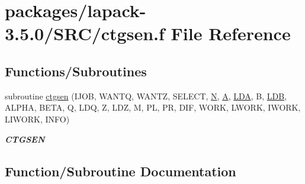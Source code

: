 \hypertarget{ctgsen_8f}{}\section{packages/lapack-\/3.5.0/\+S\+R\+C/ctgsen.f File Reference}
\label{ctgsen_8f}
\subsection*{Functions/\+Subroutines}
\begin{DoxyCompactItemize}
\item 
subroutine \hyperlink{ctgsen_8f_a4212239425513e28d47970d7d8d634c3}{ctgsen} (I\+J\+O\+B, W\+A\+N\+T\+Q, W\+A\+N\+T\+Z, S\+E\+L\+E\+C\+T, \hyperlink{polmisc_8c_a0240ac851181b84ac374872dc5434ee4}{N}, \hyperlink{classA}{A}, \hyperlink{example__user_8c_ae946da542ce0db94dced19b2ecefd1aa}{L\+D\+A}, B, \hyperlink{example__user_8c_a50e90a7104df172b5a89a06c47fcca04}{L\+D\+B}, A\+L\+P\+H\+A, B\+E\+T\+A, Q, L\+D\+Q, Z, L\+D\+Z, M, P\+L, P\+R, D\+I\+F, W\+O\+R\+K, L\+W\+O\+R\+K, I\+W\+O\+R\+K, L\+I\+W\+O\+R\+K, I\+N\+F\+O)
\begin{DoxyCompactList}\small\item\em {\bfseries C\+T\+G\+S\+E\+N} \end{DoxyCompactList}\end{DoxyCompactItemize}


\subsection{Function/\+Subroutine Documentation}
\hypertarget{ctgsen_8f_a4212239425513e28d47970d7d8d634c3}{}
